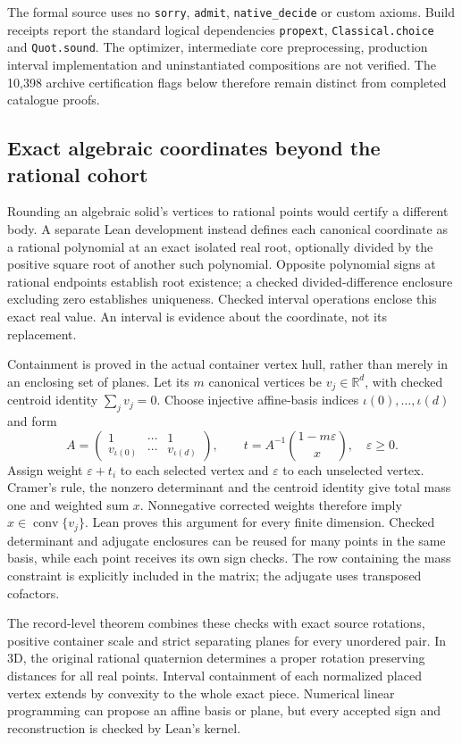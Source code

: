 \documentclass[11pt,a4paper]{article}
\newcommand{\R}{\mathbb R}
\newcommand{\conv}{\operatorname{conv}}
\newcommand{\code}[1]{\texttt{\nolinkurl{#1}}}
\begin{document}
The formal source uses no \code{sorry}, \code{admit}, \code{native_decide} or custom axioms. Build receipts report the standard logical dependencies \code{propext}, \code{Classical.choice} and \code{Quot.sound}. The optimizer, intermediate core preprocessing, production interval implementation and uninstantiated compositions are not verified. The 10,398 archive certification flags below therefore remain distinct from completed catalogue proofs.

\subsection{Exact algebraic coordinates beyond the rational cohort}
Rounding an algebraic solid's vertices to rational points would certify a different body. A separate Lean development instead defines each canonical coordinate as a rational polynomial at an exact isolated real root, optionally divided by the positive square root of another such polynomial. Opposite polynomial signs at rational endpoints establish root existence; a checked divided-difference enclosure excluding zero establishes uniqueness. Checked interval operations enclose this exact real value. An interval is evidence about the coordinate, not its replacement.

Containment is proved in the actual container vertex hull, rather than merely in an enclosing set of planes. Let its $m$ canonical vertices be $v_j\in\R^d$, with checked centroid identity $\sum_jv_j=0$. Choose injective affine-basis indices $\iota(0),\ldots,\iota(d)$ and form
\[
A=\begin{pmatrix}1&\cdots&1\\v_{\iota(0)}&\cdots&v_{\iota(d)}\end{pmatrix},
\qquad t=A^{-1}\binom{1-m\varepsilon}{x},\quad \varepsilon\geq0.
\]
Assign weight $\varepsilon+t_i$ to each selected vertex and $\varepsilon$ to each unselected vertex. Cramer's rule, the nonzero determinant and the centroid identity give total mass one and weighted sum $x$. Nonnegative corrected weights therefore imply $x\in\conv\{v_j\}$. Lean proves this argument for every finite dimension. Checked determinant and adjugate enclosures can be reused for many points in the same basis, while each point receives its own sign checks. The row containing the mass constraint is explicitly included in the matrix; the adjugate uses transposed cofactors.

The record-level theorem combines these checks with exact source rotations, positive container scale and strict separating planes for every unordered pair. In 3D, the original rational quaternion determines a proper rotation preserving distances for all real points. Interval containment of each normalized placed vertex extends by convexity to the whole exact piece. Numerical linear programming can propose an affine basis or plane, but every accepted sign and reconstruction is checked by Lean's kernel.
\end{document}
